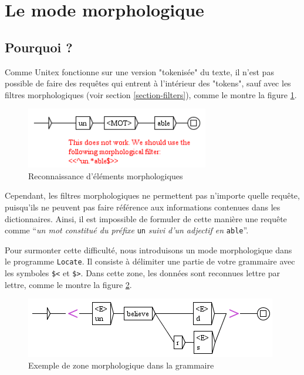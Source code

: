 \clearpage

\section{Le mode morphologique}
\label{section-morphological-mode}
\subsection{Pourquoi ?}
Comme Unitex fonctionne sur une version "tokenisée" du texte, il n'est pas possible de
faire des requêtes qui entrent à l'intérieur des "tokens", sauf avec les filtres morphologiques
(voir section \ref{section-filters}), comme le montre la figure
\ref{fig-morpho1}.

\begin{figure}[!ht]
\begin{center}
\includegraphics[width=8cm]{resources/img/fig6-17k.png}
\caption{Reconnaissance d'éléments morphologiques\label{fig-morpho1}}
\end{center}
\end{figure}

\bigskip
\noindent Cependant, les filtres morphologiques ne permettent pas n'importe quelle requête, puisqu'ils ne
peuvent pas faire référence aux informations contenues dans les dictionnaires. Ainsi, il est impossible de formuler de cette 
manière une requête comme ``\textit{un mot constitué du préfixe} \verb$un$ \textit{suivi d'un adjectif en} \verb+able+''.

\bigskip
\noindent Pour surmonter cette difficulté, nous introduisons un mode morphologique dans le programme
\verb$Locate$. Il consiste à délimiter une partie de votre  grammaire avec les 
symboles \verb+$<+ et \verb+$>+.\index{\verb+$<+}\index{\verb+$>+}
Dans cette zone, les données sont reconnues lettre par lettre, comme le montre la figure
\ref{fig-morpho2}.

\begin{figure}[!ht]
\begin{center}
\includegraphics[width=11cm]{resources/img/fig6-17l.png}
\caption{Exemple de zone morphologique dans la grammaire\label{fig-morpho2}}
\end{center}
\end{figure}


